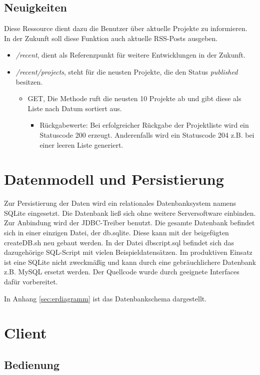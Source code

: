 \documentclass[12pt]{scrartcl}
\begin{document}
\subsection{Neuigkeiten}
Diese Ressource dient dazu die Benutzer über aktuelle Projekte zu informieren. In der Zukunft soll diese Funktion auch aktuelle RSS-Posts ausgeben.
\begin{itemize}
	\item\emph{/recent}, dient als Referenzpunkt für weitere Entwicklungen in der Zukunft.
	\item\emph{/recent/projects}, steht für die neusten Projekte, die den Status \emph{published} besitzen.
	\begin{itemize}
		\item GET, Die Methode ruft die neusten 10 Projekte ab und gibt diese als Liste nach Datum sortiert aus.
		\begin{itemize}
			\item Rückgabewerte: Bei erfolgreicher Rückgabe der Projektliste wird ein Statuscode 200 erzeugt. Anderenfalls wird ein Statuscode 204 z.B. bei einer leeren Liste generiert.
		\end{itemize}
	\end{itemize} 
\end{itemize}
	\section{Datenmodell und Persistierung}
	Zur Persistierung der Daten wird ein relationales Datenbanksystem namens SQLite eingesetzt. Die Datenbank ließ sich ohne weitere Serversoftware einbinden. Zur Anbindung wird der JDBC-Treiber benutzt. Die gesamte Datenbank befindet sich in einer einzigen Datei, der db.sqlite. Diese kann mit der beigefügten createDB.sh neu gebaut werden. In der Datei dbscript.sql befindet sich das dazugehörige SQL-Script mit vielen Beispieldatensätzen. Im produktiven Einsatz ist eine SQLite nicht zweckmäßig und kann durch eine gebräuchlichere Datenbank z.B. MySQL ersetzt werden. Der Quellcode wurde durch geeignete Interfaces dafür vorbereitet.
	
	In Anhang \ref{sec:erdiagramm} ist das Datenbankschema dargestellt. 
	\section{Client}
	\label{sec:client}
		\subsection{Bedienung}
		
\end{document}
